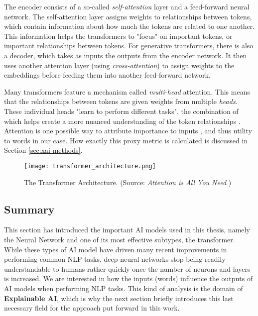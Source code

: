 The encoder consists of a so-called \textit{self-attention} layer and a feed-forward neural network.
The self-attention layer assigns weights to relationships between tokens, which contain information about how much the tokens are related to one another.
This information helps the transformers to "focus" on important tokens, or important relationships between tokens.
For generative transformers, there is also a decoder, which takes as inputs the outputs from the encoder network.
It then uses another attention layer (using \textit{cross-attention}) to assign weights to the embeddings before feeding them into another feed-forward network.

Many transformers feature a mechanism called \textit{multi-head} attention.
This means that the relationships between tokens are given weights from multiple \textit{heads}.
These individual heads "learn to perform different tasks", the combination of which helps create a more nuanced understanding of the token relationships \cite{vaswani2017attention}.
Attention is one possible way to attribute importance to inputs \cite{liUnderstandingNeuralNetworks2017}, and thus utility to words in our case.
How exactly this proxy metric is calculated is discussed in Section \ref{sec:xai-methods}.


\begin{figure}[H]
	\centering
	\texttt{[image: transformer\_architecture.png]}
	\caption{The Transformer Architecture. (Source: \textit{Attention is All You Need} \cite{vaswani2017attention})}
	\label{fig:transformer-architecture}
\end{figure}



\subsection{Summary}
This section has introduced the important AI models used in this thesis, namely the Neural Network and one of its most effective subtypes, the transformer.
While these types of AI model have driven many recent improvements in performing common NLP tasks, deep neural networks stop being readily understandable to humans rather quickly once the number of neurons and layers is increased.
We are interested in how the inputs (words) influence the outputs of AI models when performing NLP tasks.
This kind of analysis is the domain of \textbf{Explainable AI}, which is why the next section briefly introduces this last necessary field for the approach put forward in this work.

